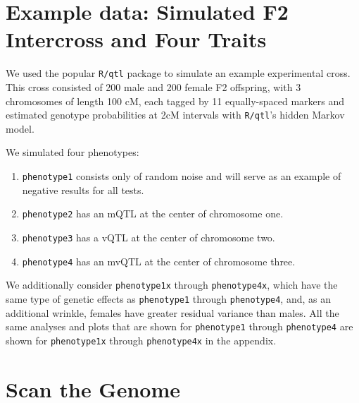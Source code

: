 \documentclass[9pt,twocolumn,twoside]{gsag3jnl}
\begin{document}
\section*{Example data: Simulated F2 Intercross and Four Traits}

We used the popular \texttt{R/qtl} package to simulate an example experimental cross.
This cross consisted of 200 male and 200 female F2 offspring, with 3 chromosomes of length 100 cM, each tagged by 11 equally-spaced markers and estimated genotype probabilities at 2cM intervals with \texttt{R/qtl}'s hidden Markov model.

We simulated four phenotypes:

\begin{enumerate}
	\item \texttt{phenotype1} consists only of random noise and will serve as an example of negative results for all tests.
	\item \texttt{phenotype2} has an mQTL at the center of chromosome one.
	\item \texttt{phenotype3} has a vQTL at the center of chromosome two.
	\item \texttt{phenotype4} has an mvQTL at the center of chromosome three.
\end{enumerate}

We additionally consider \texttt{phenotype1x} through \texttt{phenotype4x}, which have the same type of genetic effects as \texttt{phenotype1} through \texttt{phenotype4}, and, as an additional wrinkle, females have greater residual variance than males.
All the same analyses and plots that are shown for \texttt{phenotype1} through \texttt{phenotype4} are shown for \texttt{phenotype1x} through \texttt{phenotype4x} in the appendix.




\section*{Scan the Genome}
\end{document}
